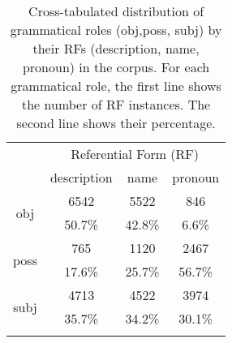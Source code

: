 \begin{table}[ht]
\centering
\begin{tabular}{cccc}
  \lsptoprule
\multirow{2}{*}{Grammatical Role} & \multicolumn{3}{c}{Referential Form (RF)} \\
 \cline{2-4} & \multicolumn{1}{c}{description} & \multicolumn{1}{c}{name} & \multicolumn{1}{c}{pronoun} \\ 
  \midrule
\multirow{2}{*}{obj} &  6542 &  5522 &   846 \\ 
    & 50.7\% & 42.8\% & 6.6\% \\ 
  \hline
\multirow{2}{*}{poss} &   765 &  1120 &  2467 \\ 
    & 17.6\% & 25.7\% & 56.7\% \\ 
  \hline
\multirow{2}{*}{subj} &  4713 &  4522 &  3974 \\ 
    & 35.7\% & 34.2\% & 30.1\% \\ 
   \lspbottomrule
\end{tabular}
\caption[Cross-tabulated distribution of grammatical roles (obj,poss, subj) by their RFs (description, name, pronoun) in the \wsj corpus.]{Cross-tabulated distribution of grammatical roles (obj,poss, subj) by their RFs (description, name, pronoun) in the \wsj corpus. For each grammatical role, the first line shows the number of RF instances. The second line shows their percentage.} 
\label{tab:refexgm}
\end{table}
